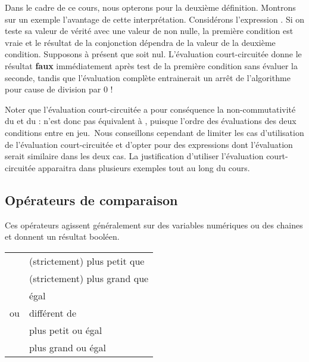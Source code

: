 			Dans le cadre de ce cours, nous opterons pour la deuxième définition.
			Montrons sur un exemple l’avantage de cette interprétation. Considérons
			l’expression 
			\textstyleCodeInsr{${\neq}$}. Si on teste sa valeur de vérité avec une
			valeur de  non nulle, la première condition est
			vraie et le résultat de la conjonction dépendra de la valeur de la
			deuxième condition. Supposons à présent que  soit
			nul. L’évaluation court-circuitée donne le résultat \textbf{faux}
			immédiatement après test de la première condition sans évaluer la
			seconde, tandis que l’évaluation complète entrainerait un arrêt de
			l’algorithme pour cause de division par 0 !
	
			Noter que l’évaluation court-circuitée a pour conséquence la
			non-commutativité du  et du
			:  n’est donc
			pas équivalent à , puisque l’ordre
			des évaluations des deux conditions entre en jeu.~Nous conseillons
			cependant de limiter les cas d’utilisation de l’évaluation
			court-circuitée et d'opter pour des expressions dont
			l’évaluation serait similaire dans les deux cas. La justification
			d’utiliser l’évaluation court-circuitée apparaitra dans plusieurs
			exemples tout au long du cours.
	
		\subsection{Opérateurs de comparaison}
	
				Ces opérateurs agissent généralement sur des variables numériques ou des
				chaines et donnent un résultat booléen.
	
			\begin{center}
			\tablehead{}
			\begin{supertabular}{m{1cm}|m{12cm}}
			\raggedleft  \textstyleCodeInsr{\textless} & (strictement) plus petit que\\
			\raggedleft  \textstyleCodeInsr{\textgreater} & (strictement) plus grand que\\
			\raggedleft  \textstyleCodeInsr{=} & égal\\
			\raggedleft  \textstyleCodeInsr{{\textless}{\textgreater}}
				ou \textstyleCodeInsr{${\neq}$} &  différent de\\
			\raggedleft  \textstyleCodeInsr{${\leq}$} & plus petit ou égal\\
			\raggedleft  \textstyleCodeInsr{${\geq}$} & plus grand ou égal\\
			\end{supertabular}
			\end{center}
	
